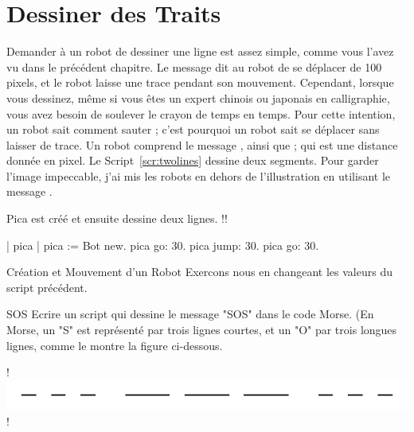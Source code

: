 \documentclass[a4paper,10pt,twoside]{book}
\begin{document}


\section{Dessiner des Traits}

Demander \`a un robot de dessiner une ligne est assez simple, comme vous l'avez vu dans le pr\'ec\'edent chapitre. Le message  dit au robot de se d\'eplacer de 100 pixels, et le robot laisse une trace pendant son mouvement. Cependant, lorsque vous dessinez, m\^eme si vous \^etes un expert chinois ou japonais en calligraphie, 
vous avez besoin de soulever le crayon de temps en temps. Pour cette intention, un robot sait comment sauter ; 
c'est pourquoi un robot sait se d\'eplacer sans laisser de trace. Un robot comprend le message , ainsi que ; qui est une distance donn\'ee en pixel. Le Script~\ref{scr:twolines} dessine deux segments. Pour garder l'image impeccable, j'ai mis les robots en dehors de l'illustration 
en utilisant le message . 


\begin{script}[twolines]{Pica est cr\'e\'e et ensuite dessine deux lignes.}
!!

| pica | 
pica := Bot new. 
pica go: 30. 
pica jump: 30. 
pica go: 30. 
\end{script}


\begin{experiment}[xp1]{Cr\'eation et Mouvement d'un Robot}
Exercons nous en changeant les valeurs du script pr\'ec\'edent. 
\end{experiment}

\begin{experiment}[sos]{SOS}
Ecrire un script qui dessine le message "SOS" dans le code Morse. (En Morse, un "S" est repr\'esent\'e par trois lignes courtes, et un "O" par trois longues lignes, comme le montre la figure ci-dessous.
 
!\includegraphics{turtleMSosLines}!
\end{experiment}
\end{document}

